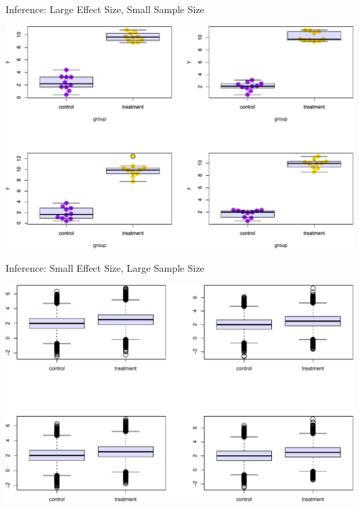 \documentclass[ignorenonframetext,]{beamer}
\begin{document}
\begin{frame}{Inference: Large Effect Size, Small Sample Size}
\protect\hypertarget{inference-large-effect-size-small-sample-size}{}

\includegraphics{biostats_I_files/figure-beamer/unnamed-chunk-6-1.pdf}

\end{frame}

\begin{frame}{Inference: Small Effect Size, Large Sample Size}
\protect\hypertarget{inference-small-effect-size-large-sample-size}{}

\includegraphics{biostats_I_files/figure-beamer/unnamed-chunk-7-1.pdf}

\end{frame}
\end{document}
